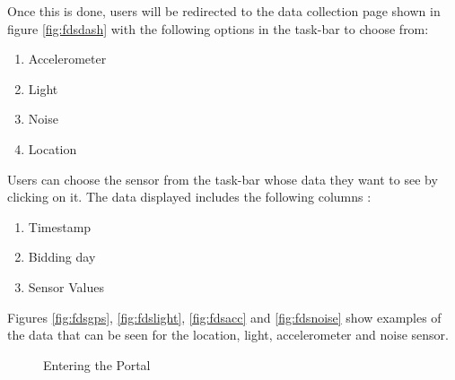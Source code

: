Once this is done, users will be redirected to the data collection page shown in figure \ref{fig:fdsdash} with the following options in the task-bar  to choose from:

\begin{enumerate}
    \item Accelerometer
    \item Light
    \item Noise
    \item Location
\end{enumerate}

Users can choose the sensor from the task-bar whose data they want to see by clicking on it. The data displayed includes the following columns :

\begin{enumerate}
    \item Timestamp
    \item Bidding day
    \item Sensor Values
\end{enumerate}

Figures \ref{fig:fdsgps}, \ref{fig:fdslight}, \ref{fig:fdsacc} and \ref{fig:fdsnoise} show examples of the data that can be seen for the location,
light, accelerometer and noise sensor.



\begin{figure}[htp]
  \hspace{1em}\hspace{1em}
  \caption{Entering the Portal}
  \label{fig:fds1}
\end{figure}


